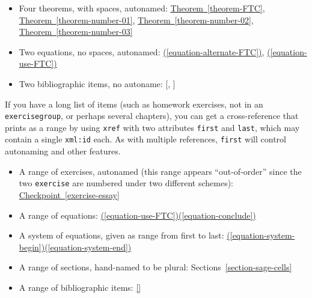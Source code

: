 \documentclass{amsart}
\theoremstyle{plain}%
\theoremstyle{definition}%
\theoremstyle{remark}%
\newcommand{\xreffont}{\relax}
\newcommand{\mono}[1]{\texttt{#1}}
\numberwithin{equation}{section}
\begin{document}
\begin{itemize}[label=\textbullet]
\item{}Four theorems, with spaces, autonamed: \hyperref[theorem-FTC]{Theorem~{\xreffont\ref{theorem-FTC}}}, \hyperref[theorem-number-01]{Theorem~{\xreffont\ref{theorem-number-01}}}, \hyperref[theorem-number-02]{Theorem~{\xreffont\ref{theorem-number-02}}}, \hyperref[theorem-number-03]{Theorem~{\xreffont\ref{theorem-number-03}}}%
\item{}Two equations, no spaces, autonamed: \hyperref[equation-alternate-FTC]{({\xreffont\ref{equation-alternate-FTC}})}, \hyperref[equation-use-FTC]{({\xreffont\ref{equation-use-FTC}})}%
\item{}Two bibliographic items, no autoname: [\hyperlink{biblio-judson-AATA}{{\xreffont 1}}, \hyperlink{biblio-lay-article}{{\xreffont 2}}]%
\end{itemize}
%
\par
If you have a long list of items (such as homework exercises, not in an \mono{exercisegroup}, or perhaps several chapters), you can get a cross-reference that prints as a range by using \mono{xref} with two attributes \mono{first} and \mono{last}, which may contain a single \mono{xml:id} each.  As with multiple references, \mono{first} will control autonaming and other features.%
\begin{itemize}[label=\textbullet]
\item{}A range of exercises, autonamed (this range appears ``out-of-order'' since the two \mono{exercise} are numbered under two different schemes): \hyperref[exercise-essay]{Checkpoint~{\xreffont\ref{exercise-essay}}\textendash{}{\xreffont 4.2.3.1}}%
\item{}A range of equations: \hyperref[equation-use-FTC]{({\xreffont\ref{equation-use-FTC}})\textendash{}({\xreffont\ref{equation-conclude}})}%
\item{}A system of equations, given as range from first to last: \hyperref[equation-system-begin]{({\xreffont\ref{equation-system-begin}})\textendash{}({\xreffont\ref{equation-system-end}})}%
\item{}A range of sections, hand-named to be plural: Sections~\hyperref[section-sage-cells]{{\xreffont\ref{section-sage-cells}}\textendash{}{\xreffont\ref{section-cross-referencing}}}%
\item{}A range of bibliographic items: \hyperlink{biblio-judson-AATA}{[{\xreffont 1}\textendash{}{\xreffont 2}]}%
\end{itemize}
%
\par
\end{document}
